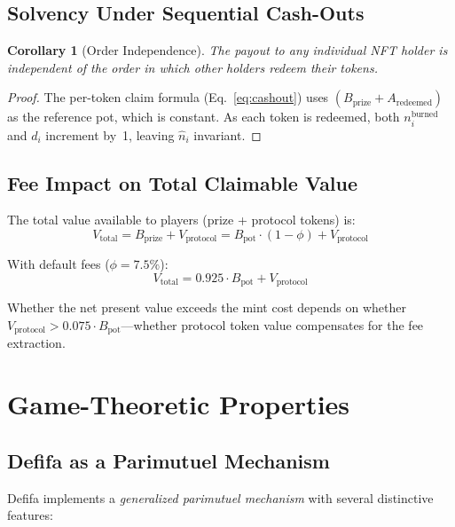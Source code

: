 \documentclass[11pt,a4paper]{article}
\newtheorem{corollary}[theorem]{Corollary}
\begin{document}
\subsection{Solvency Under Sequential Cash-Outs}

\begin{corollary}[Order Independence]
The payout to any individual NFT holder is independent of the order in which other holders redeem their tokens.
\end{corollary}

\begin{proof}
The per-token claim formula (Eq.~\ref{eq:cashout}) uses $(B_{\text{prize}} + A_{\text{redeemed}})$ as the reference pot, which is constant. As each token is redeemed, both $n_i^{\text{burned}}$ and $d_i$ increment by~1, leaving $\hat{n}_i$ invariant.
\end{proof}

\subsection{Fee Impact on Total Claimable Value}

The total value available to players (prize + protocol tokens) is:
\begin{equation}
V_{\text{total}} = B_{\text{prize}} + V_{\text{protocol}} = B_{\text{pot}} \cdot (1 - \phi) + V_{\text{protocol}}
\end{equation}

With default fees ($\phi = 7.5\%$):
$$V_{\text{total}} = 0.925 \cdot B_{\text{pot}} + V_{\text{protocol}}$$

Whether the net present value exceeds the mint cost depends on whether $V_{\text{protocol}} > 0.075 \cdot B_{\text{pot}}$---whether protocol token value compensates for the fee extraction.

\section{Game-Theoretic Properties}

\subsection{Defifa as a Parimutuel Mechanism}

Defifa implements a \emph{generalized parimutuel mechanism} with several distinctive features:
\end{document}
